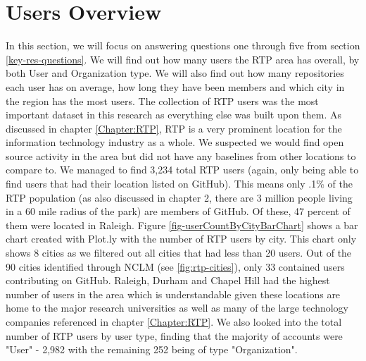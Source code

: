 \section{Users Overview}
In this section, we will focus on answering questions one through five from section \ref{key-res-questions}. We will find out how many users the RTP area has overall, by both User and Organization type. We will also find out how many repositories each user has on average, how long they have been members and which city in the region has the most users. The collection of RTP users was the most important dataset in this research as everything else was built upon them. As discussed in chapter \ref{Chapter:RTP}, RTP is a very prominent location for the information technology industry as a whole. We suspected we would find open source activity in the area but did not have any baselines from other locations to compare to. We managed to find 3,234 total RTP users (again, only being able to find users that had their location listed on GitHub). This means only .1\% of the RTP population (as also discussed in chapter 2, there are 3 million people living in a 60 mile radius of the park) are members of GitHub. Of these, 47 percent of them were located in Raleigh. Figure \ref{fig-userCountByCityBarChart} shows a bar chart created with Plot.ly with the number of RTP users by city. This chart only shows 8 cities as we filtered out all cities that had less than 20 users. Out of the 90 cities identified through NCLM (see \ref{fig:rtp-cities}), only 33 contained users contributing on GitHub. Raleigh, Durham and Chapel Hill had the highest number of users in the area which is understandable given these locations are home to the major research universities as well as many of the large technology companies referenced in chapter \ref{Chapter:RTP}. We also looked into the total number of RTP users by user type, finding that the majority of accounts were "User" - 2,982 with the remaining 252 being of type "Organization".

